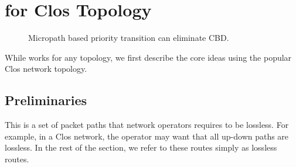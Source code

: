\section{\sysname{} for Clos Topology}
\label{sec:specific}

\begin{figure}[t]
	
	\centering
	

	
	
	\caption{Micropath based priority transition can eliminate CBD.}\label{fig:priority_transition}
\end{figure}

While \sysname{} works for any topology, we first describe the core ideas using
the popular Clos network topology. 

\subsection {Preliminaries}

 This is a set of packet paths that network
operators requires to be lossless. For example, in a Clos network, the
operator may want that all up-down paths are lossless. In the rest of the
section, we refer to these routes simply as lossless routes. 

